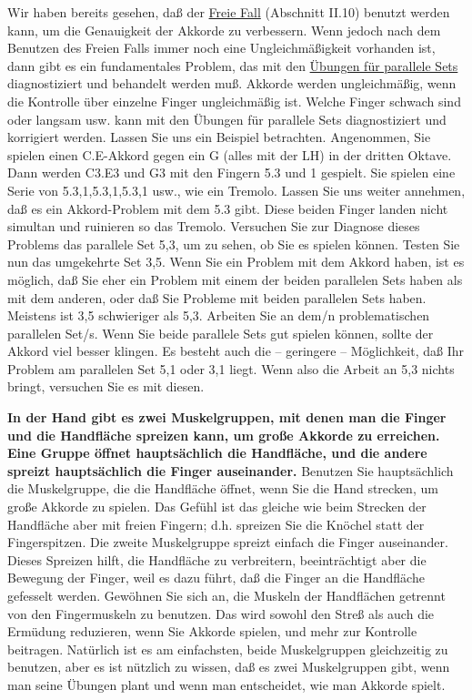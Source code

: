 Wir haben bereits gesehen, daß der \hyperref[c1ii10]{Freie Fall} (Abschnitt II.10) benutzt werden kann, um die Genauigkeit der Akkorde zu verbessern.
Wenn jedoch nach dem Benutzen des Freien Falls immer noch eine Ungleichmäßigkeit vorhanden ist, dann gibt es ein fundamentales Problem, das mit den \hyperref[c1iii7b]{Übungen für parallele Sets} diagnostiziert und behandelt werden muß.
Akkorde werden ungleichmäßig, wenn die Kontrolle über einzelne Finger ungleichmäßig ist.
Welche Finger schwach sind oder langsam usw. kann mit den Übungen für parallele Sets diagnostiziert und korrigiert werden.
Lassen Sie uns ein Beispiel betrachten.
Angenommen, Sie spielen einen C.E-Akkord gegen ein G (alles mit der LH) in der dritten Oktave.
Dann werden C3.E3 und G3 mit den Fingern 5.3 und 1 gespielt.
Sie spielen eine Serie von 5.3,1,5.3,1,5.3,1 usw., wie ein Tremolo.
Lassen Sie uns weiter annehmen, daß es ein Akkord-Problem mit dem 5.3 gibt.
Diese beiden Finger landen nicht simultan und ruinieren so das Tremolo.
Versuchen Sie zur Diagnose dieses Problems das parallele Set 5,3, um zu sehen, ob Sie es spielen können.
Testen Sie nun das umgekehrte Set 3,5.
Wenn Sie ein Problem mit dem Akkord haben, ist es möglich, daß Sie eher ein Problem mit einem der beiden parallelen Sets haben als mit dem anderen, oder daß Sie Probleme mit beiden parallelen Sets haben.
Meistens ist 3,5 schwieriger als 5,3.
Arbeiten Sie an dem/n problematischen parallelen Set/s.
Wenn Sie beide parallele Sets gut spielen können, sollte der Akkord viel besser klingen.
Es besteht auch die -- geringere -- Möglichkeit, daß Ihr Problem am parallelen Set 5,1 oder 3,1 liegt.
Wenn also die Arbeit an 5,3 nichts bringt, versuchen Sie es mit diesen.

\textbf{In der Hand gibt es zwei Muskelgruppen, mit denen man die Finger und die Handfläche spreizen kann, um große Akkorde zu erreichen.
Eine Gruppe öffnet hauptsächlich die Handfläche, und die andere spreizt hauptsächlich die Finger auseinander.}
Benutzen Sie hauptsächlich die Muskelgruppe, die die Handfläche öffnet, wenn Sie die Hand strecken, um große Akkorde zu spielen.
Das Gefühl ist das gleiche wie beim Strecken der Handfläche aber mit freien Fingern; d.h. spreizen Sie die Knöchel statt der Fingerspitzen.
Die zweite Muskelgruppe spreizt einfach die Finger auseinander.
Dieses Spreizen hilft, die Handfläche zu verbreitern, beeinträchtigt aber die Bewegung der Finger, weil es dazu führt, daß die Finger an die Handfläche gefesselt werden.
Gewöhnen Sie sich an, die Muskeln der Handflächen getrennt von den Fingermuskeln zu benutzen.
Das wird sowohl den Streß als auch die Ermüdung reduzieren, wenn Sie Akkorde spielen, und mehr zur Kontrolle beitragen.
Natürlich ist es am einfachsten, beide Muskelgruppen gleichzeitig zu benutzen, aber es ist nützlich zu wissen, daß es zwei Muskelgruppen gibt, wenn man seine Übungen plant und wenn man entscheidet, wie man Akkorde spielt.

